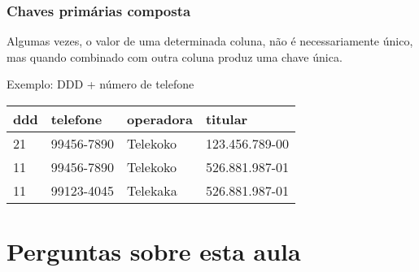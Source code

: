 \documentclass[t, 10pt, aspectratio=169, table, x11names]{beamer}
\begin{document}
	\begin{frame}[t]
		\frametitle{Chaves primárias composta}
		Algumas vezes, o valor de uma determinada coluna, não é necessariamente único, mas quando combinado com outra coluna produz uma chave única.
		
		Exemplo: DDD + número de telefone

		\begin{table}[ht]
			\centering
			\footnotesize
			\begin{tabular}{|l|l|l|l|}
				\hline
				\rowcolor{SeaGreen3!30!}
				\textbf{ddd} & \textbf{telefone} & \textbf{operadora} & \textbf{titular} \\
				\hline
				21 & 99456-7890 & Telekoko & 123.456.789-00 \\
				\hline
				11 & 99456-7890 & Telekoko & 526.881.987-01 \\
				\hline
				11 & 99123-4045 & Telekaka & 526.881.987-01 \\
				\hline
			\end{tabular}
		\end{table}

	\end{frame}

	\section{Perguntas sobre esta aula}
\end{document}
